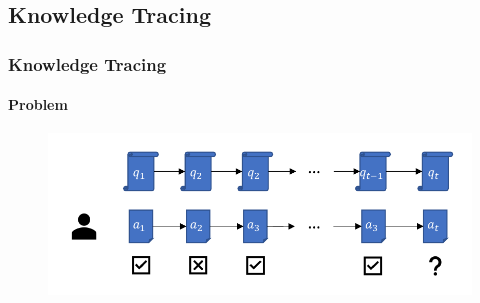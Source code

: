 \documentclass{beamer}
\begin{document}

\subsection{Knowledge Tracing}

\begin{frame}
  \frametitle{Knowledge Tracing}
  \framesubtitle{Problem}
  \begin{figure}
    \includegraphics[width=1.0\textwidth]{figures/ch3-model-ktdes.pdf}
  \end{figure}
\end{frame}
\end{document}
